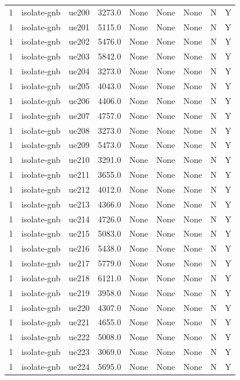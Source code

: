 \begin{table}[ht]
\begin{tabular}{|c|c|c|c|c|c|c|c|c|}
1 & isolate-gnb & ue200 & 3273.0 & None & None & None & N & Y \\
1 & isolate-gnb & ue201 & 5115.0 & None & None & None & N & Y \\
1 & isolate-gnb & ue202 & 5476.0 & None & None & None & N & Y \\
1 & isolate-gnb & ue203 & 5842.0 & None & None & None & N & Y \\
1 & isolate-gnb & ue204 & 3273.0 & None & None & None & N & Y \\
1 & isolate-gnb & ue205 & 4043.0 & None & None & None & N & Y \\
1 & isolate-gnb & ue206 & 4406.0 & None & None & None & N & Y \\
1 & isolate-gnb & ue207 & 4757.0 & None & None & None & N & Y \\
1 & isolate-gnb & ue208 & 3273.0 & None & None & None & N & Y \\
1 & isolate-gnb & ue209 & 5473.0 & None & None & None & N & Y \\
1 & isolate-gnb & ue210 & 3291.0 & None & None & None & N & Y \\
1 & isolate-gnb & ue211 & 3655.0 & None & None & None & N & Y \\
1 & isolate-gnb & ue212 & 4012.0 & None & None & None & N & Y \\
1 & isolate-gnb & ue213 & 4366.0 & None & None & None & N & Y \\
1 & isolate-gnb & ue214 & 4726.0 & None & None & None & N & Y \\
1 & isolate-gnb & ue215 & 5083.0 & None & None & None & N & Y \\
1 & isolate-gnb & ue216 & 5438.0 & None & None & None & N & Y \\
1 & isolate-gnb & ue217 & 5779.0 & None & None & None & N & Y \\
1 & isolate-gnb & ue218 & 6121.0 & None & None & None & N & Y \\
1 & isolate-gnb & ue219 & 3958.0 & None & None & None & N & Y \\
1 & isolate-gnb & ue220 & 4307.0 & None & None & None & N & Y \\
1 & isolate-gnb & ue221 & 4655.0 & None & None & None & N & Y \\
1 & isolate-gnb & ue222 & 5008.0 & None & None & None & N & Y \\
1 & isolate-gnb & ue223 & 3069.0 & None & None & None & N & Y \\
1 & isolate-gnb & ue224 & 5695.0 & None & None & None & N & Y \\

\end{tabular}
\end{table}
